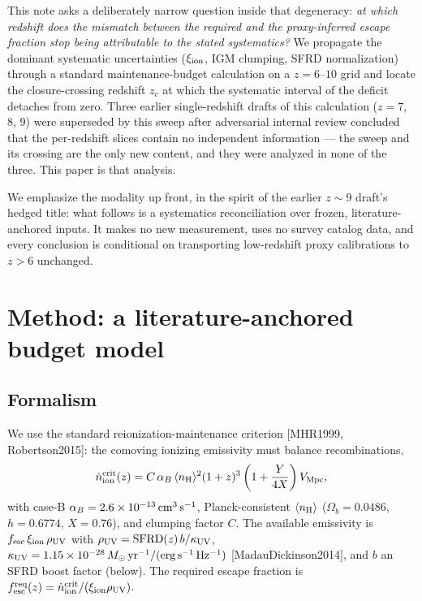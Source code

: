 \documentclass[twocolumn]{aastex702}
\begin{document}
This note asks a deliberately narrow question inside that degeneracy: \emph{at which redshift does the mismatch between the required and the proxy-inferred escape fraction stop being attributable to the stated systematics?} We propagate the dominant systematic uncertainties ($\xi_{\rm ion}$, IGM clumping, SFRD normalization) through a standard maintenance-budget calculation on a $z=6$--$10$ grid and locate the closure-crossing redshift $z_c$ at which the systematic interval of the deficit detaches from zero. Three earlier single-redshift drafts of this calculation ($z=7$, 8, 9) were superseded by this sweep after adversarial internal review concluded that the per-redshift slices contain no independent information --- the sweep and its crossing are the only new content, and they were analyzed in none of the three. This paper is that analysis.

We emphasize the modality up front, in the spirit of the earlier $z\sim9$ draft's hedged title: what follows is a systematics reconciliation over frozen, literature-anchored inputs. It makes no new measurement, uses no survey catalog data, and every conclusion is conditional on transporting low-redshift proxy calibrations to $z>6$ unchanged.

\section{Method: a literature-anchored budget model}
\label{sec:method}

\subsection{Formalism}
We use the standard reionization-maintenance criterion [MHR1999, Robertson2015]: the comoving ionizing emissivity must balance recombinations,
\begin{equation}
\dot{n}_{\rm ion}^{\rm crit}(z) = C\,\alpha_B\,\langle n_{\rm H}\rangle^2 (1+z)^3 \left(1+\frac{Y}{4X}\right) V_{\rm Mpc},
\end{equation}
with case-B $\alpha_B=2.6\times10^{-13}\,{\rm cm^3\,s^{-1}}$, Planck-consistent $\langle n_{\rm H}\rangle$ ($\Omega_b=0.0486$, $h=0.6774$, $X=0.76$), and clumping factor $C$. The available emissivity is $f_{\rm esc}\,\xi_{\rm ion}\,\rho_{\rm UV}$ with $\rho_{\rm UV} = {\rm SFRD}(z)\,b/\kappa_{\rm UV}$, $\kappa_{\rm UV}=1.15\times10^{-28}\,M_\odot\,{\rm yr^{-1}}/({\rm erg\,s^{-1}\,Hz^{-1}})$ [MadauDickinson2014], and $b$ an SFRD boost factor (below). The required escape fraction is $f_{\rm esc}^{\rm req}(z) = \dot{n}_{\rm ion}^{\rm crit}/(\xi_{\rm ion}\rho_{\rm UV})$.
\end{document}
